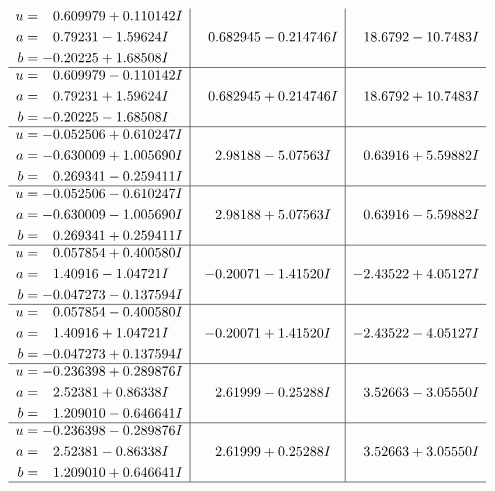 \documentclass[1p]{elsarticle_modified}
\theoremstyle{definition}
\begin{document}
$$\begin{array}{c|c|c}
\begin{aligned}
u &= \phantom{-}0.609979 + 0.110142 I \\
a &= \phantom{-}0.79231 - 1.59624 I \\
b &= -0.20225 + 1.68508 I\end{aligned}
 & \phantom{-}0.682945 - 0.214746 I & \phantom{-}18.6792 - 10.7483 I \\ \hline\begin{aligned}
u &= \phantom{-}0.609979 - 0.110142 I \\
a &= \phantom{-}0.79231 + 1.59624 I \\
b &= -0.20225 - 1.68508 I\end{aligned}
 & \phantom{-}0.682945 + 0.214746 I & \phantom{-}18.6792 + 10.7483 I \\ \hline\begin{aligned}
u &= -0.052506 + 0.610247 I \\
a &= -0.630009 + 1.005690 I \\
b &= \phantom{-}0.269341 - 0.259411 I\end{aligned}
 & \phantom{-}2.98188 - 5.07563 I & \phantom{-}0.63916 + 5.59882 I \\ \hline\begin{aligned}
u &= -0.052506 - 0.610247 I \\
a &= -0.630009 - 1.005690 I \\
b &= \phantom{-}0.269341 + 0.259411 I\end{aligned}
 & \phantom{-}2.98188 + 5.07563 I & \phantom{-}0.63916 - 5.59882 I \\ \hline\begin{aligned}
u &= \phantom{-}0.057854 + 0.400580 I \\
a &= \phantom{-}1.40916 - 1.04721 I \\
b &= -0.047273 - 0.137594 I\end{aligned}
 & -0.20071 - 1.41520 I & -2.43522 + 4.05127 I \\ \hline\begin{aligned}
u &= \phantom{-}0.057854 - 0.400580 I \\
a &= \phantom{-}1.40916 + 1.04721 I \\
b &= -0.047273 + 0.137594 I\end{aligned}
 & -0.20071 + 1.41520 I & -2.43522 - 4.05127 I \\ \hline\begin{aligned}
u &= -0.236398 + 0.289876 I \\
a &= \phantom{-}2.52381 + 0.86338 I \\
b &= \phantom{-}1.209010 - 0.646641 I\end{aligned}
 & \phantom{-}2.61999 - 0.25288 I & \phantom{-}3.52663 - 3.05550 I \\ \hline\begin{aligned}
u &= -0.236398 - 0.289876 I \\
a &= \phantom{-}2.52381 - 0.86338 I \\
b &= \phantom{-}1.209010 + 0.646641 I\end{aligned}
 & \phantom{-}2.61999 + 0.25288 I & \phantom{-}3.52663 + 3.05550 I\\
 \hline 
 \end{array}$$\newpage\newpage\renewcommand{\arraystretch}{1}
\end{document}

